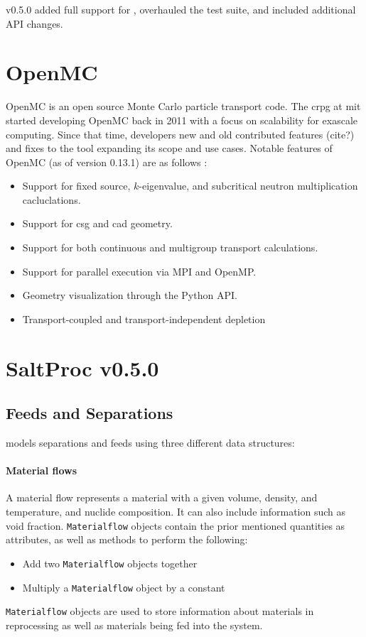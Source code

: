 \SaltProc v0.5.0 added full support for \OpenMC, overhauled the test suite, and included additional API changes.


\section{OpenMC}%
\label{sub:openmc}

OpenMC \cite{romano_openmc_2015} is an open source Monte Carlo particle
transport code. The \Gls{crpg} at \Gls{mit} started developing OpenMC back in
2011 with a focus on scalability for exascale computing. Since that time,
developers new and old contributed features (cite?) and fixes to the tool
expanding its scope and use cases. Notable features of OpenMC (as of version
0.13.1) are as follows \cite{homepage_openmc_2022}:
\begin{itemize}
    \item Support for fixed source, $k$-eigenvalue, and subcritical neutron multiplication cacluclations.
    \item Support for \Gls{csg} and \Gls{cad} geometry.
    \item Support for both continuous and multigroup transport calculations.
    \item Support for parallel execution via MPI and OpenMP.
    \item Geometry visualization through the Python API.
    \item Transport-coupled and transport-independent depletion
\end{itemize}

\section{SaltProc v0.5.0}
\label{sec:saltproc-detail}

\subsection{Feeds and Separations}
\label{sub:feeds-separations}
\SaltProc models separations and feeds using three different data structures:


\paragraph{Material flows}
    A material flow represents a material with a given
    volume, density, and temperature, and nuclide composition.
    It can also include information such as void fraction. \verb.Materialflow.
    objects contain the prior mentioned quantities as attributes, as well as
    methods to perform the following:
    \begin{itemize}
        \item Add two \verb.Materialflow. objects together
        \item Multiply a \verb.Materialflow. object by a constant
    \end{itemize}
    \verb.Materialflow. objects are used to store information about materials
    in reprocessing as well as materials being fed into the system.

